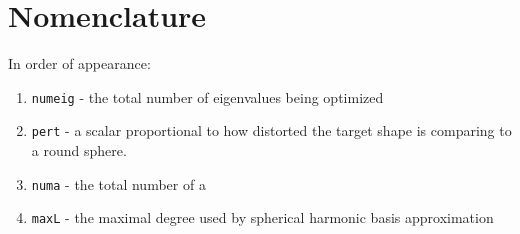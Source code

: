 \documentclass[11pt]{article}
\theoremstyle{definition}
\begin{document}
\section{Nomenclature}
In order of appearance: 
\begin{enumerate}
	\item 
	\texttt{numeig} - the total number of eigenvalues being optimized
	
	\item 
	\texttt{pert} - a scalar proportional to how distorted the target shape is comparing to a round sphere.
	
	\item 
	\texttt{numa} - the total number of a
	
	\item 
	\texttt{maxL} - the maximal degree used by spherical harmonic basis approximation
\end{enumerate}
\end{document}
